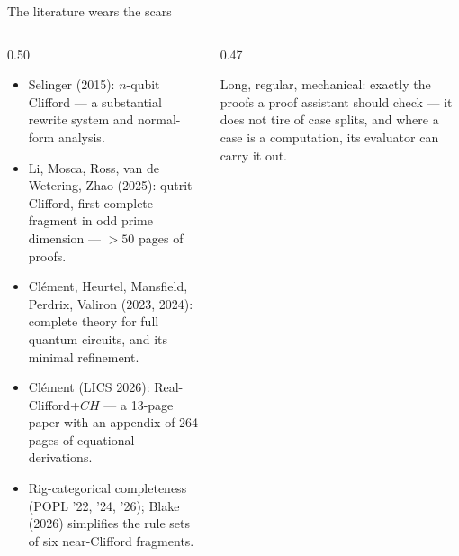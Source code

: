 \begin{frame}{The literature wears the scars \InPaper}
\begin{columns}[c]
\begin{column}{0.50\textwidth}
\small
\begin{itemize}
  \setlength{\itemsep}{3pt}
  \item Selinger (2015): $n$-qubit Clifford --- a substantial rewrite
        system and normal-form analysis.
  \item Li, Mosca, Ross, van de Wetering, Zhao (2025): qutrit Clifford, first
        complete fragment in odd prime dimension --- \alert{$>50$ pages} of proofs.
  \item Clément, Heurtel, Mansfield, Perdrix, Valiron (2023, 2024):
        complete theory for full quantum circuits, and its minimal refinement.
  \item Clément (LICS 2026): Real-Clifford+$CH$ --- a 13-page paper with an
        \alert{appendix of 264 pages} of equational derivations.
  \item Rig-categorical completeness (POPL '22, '24, '26); Blake (2026)
        simplifies the rule sets of six near-Clifford fragments.
\end{itemize}
\end{column}
\begin{column}{0.47\textwidth}
\centering
{}

{\small Long, regular, mechanical: exactly the proofs a proof assistant
should check --- it does not tire of case splits, and where a case is a
computation, its \alert{evaluator} can carry it out.}
\end{column}
\end{columns}
\end{frame}

